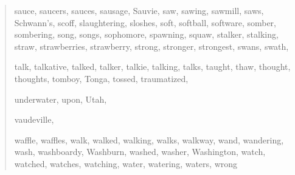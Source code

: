 \begin{quote}
    sauce, saucers, sauces, sausage, Sauvie, saw, sawing, sawmill, saws, Schwann's, scoff, slaughtering, sloshes, soft, softball, software, somber, sombering, song, songs, sophomore, spawning, squaw, stalker, stalking, straw, strawberries, strawberry, strong, stronger, strongest, swans, swath, 
    
    talk, talkative, talked, talker, talkie, talking, talks, taught, thaw, thought, thoughts, tomboy, Tonga, tossed, traumatized, 
    
    underwater, upon, Utah, 
    
    vaudeville, 
    
    waffle, waffles, walk, walked, walking, walks, walkway, wand, wandering, wash, washboardy, Washburn, washed, washer, Washington, watch, watched, watches, watching, water, watering, waters, wrong
\end{quote}